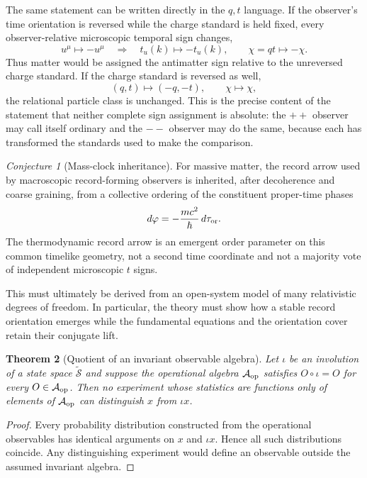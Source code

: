 \documentclass[11pt]{article}
\newtheorem{theorem}{Theorem}[section]
\theoremstyle{definition}\newtheorem{definition}[theorem]{Definition}
\theoremstyle{remark}\newtheorem{remark}[theorem]{Remark}\newtheorem{conjecture}[theorem]{Conjecture}
\begin{document}
The same statement can be written directly in the $q,t$ language. If the observer's time orientation is reversed while the charge standard is held fixed, every observer-relative microscopic temporal sign changes,
\begin{equation}\label{eq:observerreverseqt}
 u^\mu\mapsto-u^\mu
 \quad\Longrightarrow\quad
 t_u(k)\mapsto-t_u(k),\qquad \chi=qt\mapsto-\chi.
\end{equation}
Thus matter would be assigned the antimatter sign relative to the unreversed charge standard. If the charge standard is reversed as well,
\begin{equation}\label{eq:completeanti}
 (q,t)\longmapsto(-q,-t),\qquad \chi\longmapsto\chi,
\end{equation}
the relational particle class is unchanged. This is the precise content of the statement that neither complete sign assignment is absolute: the $++$ observer may call itself ordinary and the $--$ observer may do the same, because each has transformed the standards used to make the comparison.

\begin{conjecture}[Mass-clock inheritance]\label{conj:massclock}
For massive matter, the record arrow used by macroscopic record-forming observers is inherited, after decoherence and coarse graining, from a collective ordering of the constituent proper-time phases
\begin{equation}
 d\varphi=-\frac{mc^2}{\hbar}\,d\tau_{\rm or}.
\end{equation}
The thermodynamic record arrow is an emergent order parameter on this common timelike geometry, not a second time coordinate and not a majority vote of independent microscopic $t$ signs.
\end{conjecture}
This must ultimately be derived from an open-system model of many relativistic degrees of freedom. In particular, the theory must show how a stable record orientation emerges while the fundamental equations and the orientation cover retain their conjugate lift.

\begin{theorem}[Quotient of an invariant observable algebra]\label{thm:obsalg}
Let $\iota$ be an involution of a state space $\widetilde{\mathcal S}$ and suppose the operational algebra $\mathcal A_{\rm op}$ satisfies $O\circ\iota=O$ for every $O\in\mathcal A_{\rm op}$. Then no experiment whose statistics are functions only of elements of $\mathcal A_{\rm op}$ can distinguish $x$ from $\iota x$.
\end{theorem}
\begin{proof}
Every probability distribution constructed from the operational observables has identical arguments on $x$ and $\iota x$. Hence all such distributions coincide. Any distinguishing experiment would define an observable outside the assumed invariant algebra.
\end{proof}
\end{document}
